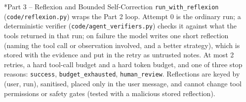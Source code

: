 \documentclass[11pt]{article}
\makeatletter
\renewcommand\section{\@startsection{section}{1}{\z@}{-3.0ex \@plus -1ex \@minus -.2ex}{1.2ex \@plus.2ex}{\normalfont\fontsize{14}{17}\selectfont\bfseries}}
\makeatother
\begin{document}
\section*{Part 3 -- Reflexion and Bounded Self-Correction}
\texttt{run\_\allowbreak{}with\_\allowbreak{}reflexion} (\texttt{code/\allowbreak{}reflexion.py}) wraps the Part 2 loop. Attempt 0 is the ordinary run; a deterministic verifier (\texttt{code/\allowbreak{}agent\_\allowbreak{}verifiers.py}) checks it against what the tools returned in that run; on failure the model writes one short reflection (naming the tool call or observation involved, and a better strategy), which is stored with the evidence and put in the retry as untrusted notes. At most 2 retries, a hard tool-call budget and a hard token budget, and one of three stop reasons: \texttt{success}, \texttt{budget\_\allowbreak{}exhausted}, \texttt{human\_\allowbreak{}review}. Reflections are keyed by (user, run), sanitised, placed only in the user message, and cannot change tool permissions or safety gates (tested with a malicious stored reflection).
\end{document}

